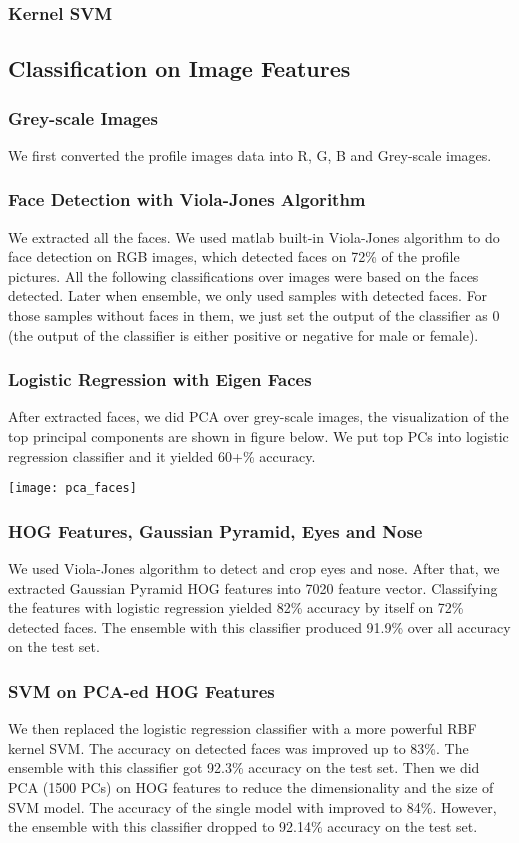\subsubsection{Kernel SVM}
\subsection{Classification on Image Features}
\subsubsection{Grey-scale Images}
We first converted the profile images data into R, G, B and Grey-scale images. 
\subsubsection{Face Detection with Viola-Jones Algorithm}
We extracted all the faces. We used matlab built-in Viola-Jones algorithm to do face detection on RGB images, which detected faces on 72\% of the profile pictures. All the following classifications over images were based on the faces detected. Later when ensemble, we only used samples with detected faces. For those samples without faces in them, we just set the output of the classifier as 0 (the output of the classifier is either positive or negative for male or female).
\subsubsection{Logistic Regression with Eigen Faces}
After extracted faces, we did PCA over grey-scale images, the visualization of the top principal components are shown in figure below. We put top PCs into logistic regression classifier and it yielded 60+\% accuracy. \\
\begin{center}
\texttt{[image: pca\_faces]}
\end{center}
\subsubsection{HOG Features, Gaussian Pyramid, Eyes and Nose}
We used Viola-Jones algorithm to detect and crop eyes and nose. After that, we extracted Gaussian Pyramid HOG features into 7020 feature vector. Classifying the features with logistic regression yielded 82\% accuracy by itself on 72\% detected faces. The ensemble with this classifier produced 91.9\% over all accuracy on the test set. 
\subsubsection{SVM on PCA-ed HOG Features}
We then replaced the logistic regression classifier with a more powerful RBF kernel SVM. The accuracy on detected faces was improved up to 83\%. The ensemble with this classifier got 92.3\% accuracy on the test set.  Then we did PCA (1500 PCs) on HOG features to reduce the dimensionality and the size of SVM model. The accuracy of the single model with improved to 84\%. However, the ensemble with this classifier dropped to 92.14\% accuracy on the test set. 
